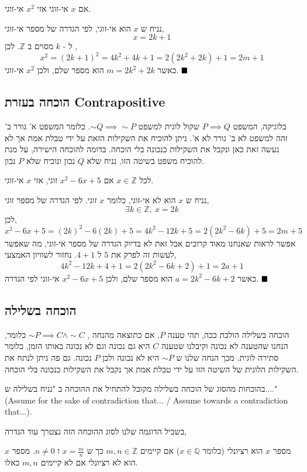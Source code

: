 \documentclass[a4paper,12pt]{article}
\renewcommand{\qed}{\hfill\blacksquare}
\newcommand{\te}[1]{\textenglish{#1}}
\begin{document}
\begin{RTL}
\begin{theorem*}
אם $x$ אי-זוגי אזי $x^2$ אי-זוגי.
\end{theorem*}

\begin{Proof}
נניח ש $x$ הוא אי-זוגי, לפי הגדרה של מספר אי-זוגי, 
$$
x = 2k + 1
$$
ל - $k$ מסוים ב $\mathbb{Z}$. לכן ,
$$
x^2 = (2k + 1)^2 = 4k^2 + 4k + 1 = 2(2k^2 + 2k) + 1 = 2m + 1
$$
כאשר $m = 2k^2 + 2k$ הוא מספר שלם, ולכן $x^2$ אי-זוגי. $\qed$
\end{Proof}

\subsection{הוכחה בעזרת \te{Contrapositive}}
בלוגיקה, המשפט $P \implies Q$ שקול לוגית למשפט $\sim Q \implies \sim P$. כלומר המשפט א' גורר ב' זהה למשפט לא ב' גורר לא א'. ניתן להוכיח את השקילות הזאת על ידי טבלת אמת אך לא נעשה זאת כאן ונקבל את השקילות כנכונה בלי הוכחה. בדומה להוכחה הישירה, על מנת להוכיח משפט בשיטה הזו, נניח שלא $Q$ נכון ונוכיח שלא $P$ נכון.
\begin{theorem*}
לכל $x \in \mathbb{Z}$ אם $x^2 - 6x + 5$ זוגי, אזי $x$ אי-זוגי.
\end{theorem*}

\begin{Proof}
נניח ש $x$ הוא לא אי-זוגי, כלומר $x$ זוגי. לפי הגדרה של מספר זוגי,
$$
\exists k \in \mathbb{Z}, \ x = 2k
$$
לכן, 
$$
x^2 - 6x + 5 = (2k)^2 - 6(2k) + 5 = 4k^2 - 12k + 5 = 2(2k^2 - 6k) + 5 = 2m + 5
$$
אפשר לראות שאנחנו מאוד קרובים אבל זאת לא בדיוק הגדרה של מספר אי-זוגי, מה שאפשר לעשות זה לפרק את $5$ ל $4+1$. נחזור לשוויון האמצעי,
$$
4k^2 - 12k + 4 + 1 = 2(2k^2 - 6k + 2) + 1 = 2a + 1
$$
כאשר $a = 2k^2 - 6k + 2$ הוא מספר שלם, ולכן $x^2 - 6x + 5$ אי-זוגי לפי הגדרה. $\qed$
\end{Proof}

\subsection{הוכחה בשלילה}
הוכחה בשלילה הולכת ככה, תהי טענה $P$, אם כתוצאה מהנחה , $\sim P \implies C \wedge \sim C$ כלומר, הנחנו שהטענה לא נכונה וקיבלנו שטענה $C$ היא גם נכונה וגם לא נכונה באותו הזמן, כלומר סתירה לוגית. מכך הנחה שלנו ש $\sim P$ היא לא נכונה ולכן $P$ נכונה. גם פה ניתן לנתח את השקילות הלוגית של השיטה הזו על ידי טבלת אמת אך נקבל את השקילות כנכונה בלי הוכחה.

\begin{remark}
  בהוכחות מהסוג של הוכחה בשלילה מקובל להתחיל את ההוכחה ב "נניח בשלילה ש...." \te{(Assume for the sake of contradiction that... / Assume towards a contradiction that...)}.
\end{remark}
בשביל הדוגמה שלנו לסוג ההוכחה הזה נצטרך עוד הגדרה,
\begin{definition}
מספר $x$ הוא רציונלי (כלומר $x \in \mathbb{Q}$) אם קיימים $m,n \in \mathbb{Z}$ כך ש $x = \frac{m}{n}$ ו $n \neq 0$. מספר $x$ הוא לא רציונלי אם לא קיימים $m,n$ כאלו.
\end{definition}


\end{RTL}
\end{document}
